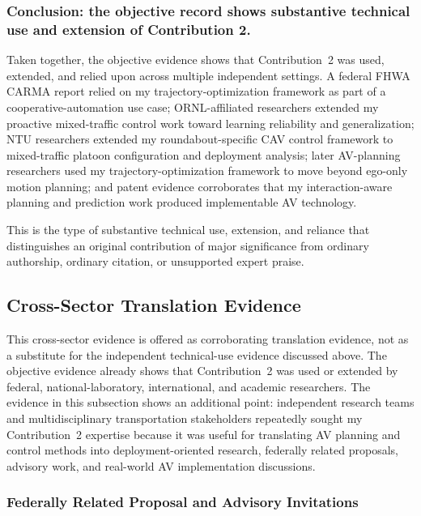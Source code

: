 \documentclass[11pt,letterpaper]{article}
\begin{document}
\subsubsection{Conclusion: the objective record shows substantive technical use and extension of Contribution 2.}

Taken together, the objective evidence shows that Contribution~2 was used, extended, and relied upon across multiple independent settings. A federal FHWA CARMA report relied on my trajectory-optimization framework as part of a cooperative-automation use case; ORNL-affiliated researchers extended my proactive mixed-traffic control work toward learning reliability and generalization; NTU researchers extended my roundabout-specific CAV control framework to mixed-traffic platoon configuration and deployment analysis; later AV-planning researchers used my trajectory-optimization framework to move beyond ego-only motion planning; and patent evidence corroborates that my interaction-aware planning and prediction work produced implementable AV technology.

This is the type of substantive technical use, extension, and reliance that distinguishes an original contribution of major significance from ordinary authorship, ordinary citation, or unsupported expert praise.

\subsection{Cross-Sector Translation Evidence}

This cross-sector evidence is offered as corroborating translation evidence, not as a substitute for the independent technical-use evidence discussed above. The objective evidence already shows that Contribution~2 was used or extended by federal, national-laboratory, international, and academic researchers. The evidence in this subsection shows an additional point: independent research teams and multidisciplinary transportation stakeholders repeatedly sought my Contribution~2 expertise because it was useful for translating AV planning and control methods into deployment-oriented research, federally related proposals, advisory work, and real-world AV implementation discussions.

\subsubsection{Federally Related Proposal and Advisory Invitations}
\end{document}
